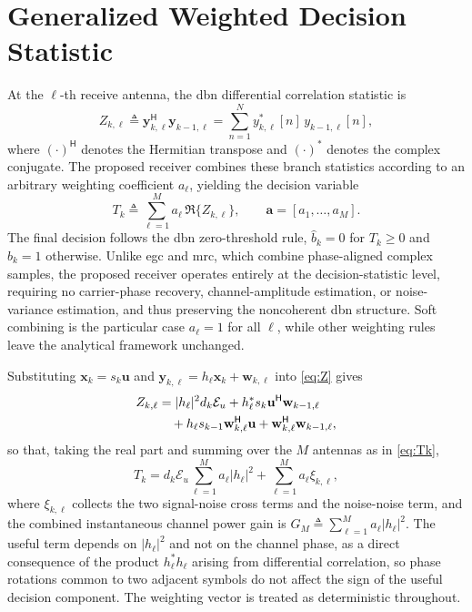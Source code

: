 \documentclass[12pt, draftclsnofoot, onecolumn]{IEEEtran}
\newcommand{\Real}{\mathfrak{R}}
\newcommand{\Eu}{\mathcal{E}_u}
\begin{document}
\section{Generalized Weighted Decision Statistic}
\label{sec:stat}

At the $\ell$-th receive antenna, the \ac{dbn} differential correlation statistic is
\begin{equation}
Z_{k,\ell} \triangleq \mathbf{y}_{k,\ell}^{\mathsf{H}}\mathbf{y}_{k-1,\ell}
= \sum_{n=1}^{N} y_{k,\ell}^{*}[n]\,y_{k-1,\ell}[n],
\label{eq:Z}
\end{equation}
where $(\cdot)^{\mathsf{H}}$ denotes the Hermitian transpose and $(\cdot)^{*}$ denotes the complex conjugate. The proposed receiver combines these branch statistics according to an arbitrary weighting coefficient $a_\ell$, yielding the decision variable
\begin{equation}
T_k \triangleq \sum_{\ell=1}^{M} a_\ell\,\Real\{Z_{k,\ell}\},
\qquad \mathbf{a} = [a_1,\dots,a_M].
\label{eq:Tk}
\end{equation}
The final decision follows the \ac{dbn} zero-threshold rule, $\hat{b}_k=0$ for $T_k\geq0$ and $\hat{b}_k=1$ otherwise. Unlike \ac{egc} and \ac{mrc}, which combine phase-aligned complex samples, the proposed receiver operates entirely at the decision-statistic level, requiring no carrier-phase recovery, channel-amplitude estimation, or noise-variance estimation, and thus preserving the noncoherent \ac{dbn} structure. Soft combining is the particular case $a_\ell = 1$ for all $\ell$, while other weighting rules leave the analytical framework unchanged.


Substituting $\mathbf{x}_k = s_k\mathbf{u}$ and $\mathbf{y}_{k,\ell} = h_\ell \mathbf{x}_k + \mathbf{w}_{k,\ell}$ into \eqref{eq:Z} gives
\begin{align}
Z_{k,\ell}
&= |h_\ell|^2 d_k \Eu
 + h_\ell^{*} s_k \mathbf{u}^{\mathsf{H}}\mathbf{w}_{k-1,\ell} \notag \\
&\quad + h_\ell s_{k-1}\mathbf{w}_{k,\ell}^{\mathsf{H}}\mathbf{u}
 + \mathbf{w}_{k,\ell}^{\mathsf{H}}\mathbf{w}_{k-1,\ell},
\label{eq:expand}
\end{align}
so that, taking the real part and summing over the $M$ antennas as in \eqref{eq:Tk},
\begin{equation}
T_k = d_k \Eu \sum_{\ell=1}^{M} a_\ell |h_\ell|^2
    + \sum_{\ell=1}^{M} a_\ell \xi_{k,\ell},
\label{eq:central}
\end{equation}
where $\xi_{k,\ell}$ collects the two signal-noise cross terms and the noise-noise term, and the combined instantaneous channel power gain is $G_M \triangleq \sum_{\ell=1}^{M} a_\ell |h_\ell|^2$. The useful term depends on $|h_\ell|^2$ and not on the channel phase, as a direct consequence of the product $h_\ell^{*}h_\ell$ arising from differential correlation, so phase rotations common to two adjacent symbols do not affect the sign of the useful decision component. The weighting vector is treated as deterministic throughout.
\end{document}

